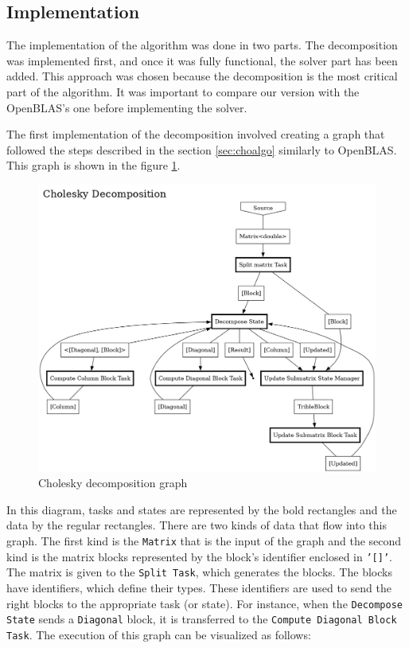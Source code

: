 \subsection{Implementation}

The implementation of the algorithm was done in two parts. The decomposition was
implemented first, and once it was fully functional, the solver part has been
added. This approach was chosen because the decomposition is the most critical
part of the algorithm. It was important to compare our version with the
OpenBLAS's one before implementing the solver.

The first implementation of the decomposition involved creating a graph that
followed the steps described in the section \ref{sec:choalgo} similarly to
OpenBLAS. This graph is shown in the figure \ref{fig:chograph}.

\begin{figure}[!ht]
  \begin{center}
    \includegraphics[scale=0.3]{img/cho-img/decompose_graph.png}
    \caption{Cholesky decomposition graph}
    \label{fig:chograph}
  \end{center}
\end{figure}

In this diagram, tasks and states are represented by the bold rectangles and the
data by the regular rectangles. There are two kinds of data that flow into this
graph. The first kind is the \texttt{Matrix} that is the input of the graph and
the second kind is the matrix blocks represented by the block's identifier
enclosed in \texttt{'[]'}. The matrix is given to the \texttt{Split Task}, which
generates the blocks. The blocks have identifiers, which define their types.
These identifiers are used to send the right blocks to the appropriate task (or
state). For instance, when the \texttt{Decompose State} sends a
\texttt{Diagonal} block, it is transferred to the \texttt{Compute Diagonal Block
Task}. The execution of this graph can be visualized as follows:

